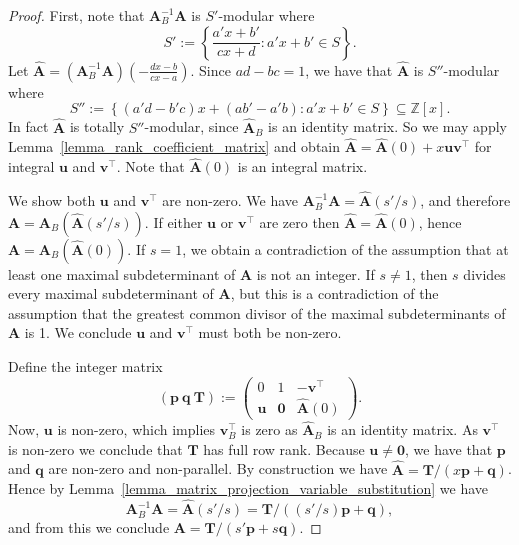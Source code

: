 \documentclass[a4paper, 11pt]{article}
\newcommand{\Z}{\mathbb{Z}}
\newcommand{\bA}{\bm{A}}
\newcommand{\bp}{\bm{p}}
\newcommand{\bq}{\bm{q}}
\newcommand{\bv}{\bm{v}}
\newcommand{\bw}{\bm{w}}
\newcommand{\bu}{\bm{u}}
\newcommand{\bT}{\bm{T}}
\newcommand{\indet}{x}
\newcommand{\polyring}{\Z[\indet]}
\newcommand{\polyS}{S}
\newcommand{\zero}{\bm{0}}
\newtheorem{proposition}{Proposition}
\begin{document}
\begin{proof}
First, note that $\bA_B^{-1}\bA$ is $\polyS'$-modular where
\[
\polyS':=\left\{\frac{a'x+b'}{cx+d}:a'x+b'\in\polyS\right\}.
\]
Let $\hat{\bA}=(\bA_B^{-1}\bA)(-\frac{dx-b}{cx-a})$. Since $ad-bc=1$, we have that $\hat{\bA}$ is $\polyS''$-modular where
\[
\polyS'':=\left\{(a'd-b'c)x+(ab'-a'b):a'x+b'\in\polyS\right\}\subseteq\polyring.
\]
In fact $\hat{\bA}$ is totally $\polyS''$-modular, since $\hat{\bA}_B$ is an identity matrix. So we may apply Lemma~\ref{lemma_rank_coefficient_matrix} and obtain $\hat{\bA}=\hat{\bA}(0)+x\bu\bv^\top$ for integral $\bu$ and $\bv^\top$. Note that $\hat{\bA}(0)$ is an integral matrix.

We show both $\bu$ and $\bv^\top$ are non-zero. We have $\bA^{-1}_B\bA=\hat{\bA}(s'/s)$, and therefore $\bA=\bA_B(\hat{\bA}(s'/s))$. If either $\bu$ or $\bv^\top$ are zero then $\hat{\bA}=\hat{\bA}(0)$, hence $\bA=\bA_B(\hat{\bA}(0))$. If $s=1$, we obtain a contradiction of the assumption that at least one maximal subdeterminant of $\bA$ is not an integer. If $s\neq 1$, then $s$ divides every maximal subdeterminant of $\bA$, but this is a contradiction of the assumption that the greatest common divisor of the maximal subdeterminants of $\bA$ is 1. We conclude $\bu$ and $\bv^\top$ must both be non-zero.

Define the integer matrix
\[
\left(\bp\ \bq\ \bT\right):=\left(\begin{array}{ccc}
0 & 1 & -\bv^{\top}\\
\bu & \zero & \hat{\bA}(0)
\end{array}\right).
\]
Now, $\bu$ is non-zero, which implies $\bv^\top_B$ is zero as $\hat{\bA}_B$ is an identity matrix. As $\bv^\top$ is non-zero we conclude that $\bT$ has full row rank. Because $\bu\neq\zero$, we have that $\bp$ and $\bq$ are non-zero and non-parallel. By construction we have $\hat{\bA}=\bT/(x\bp + \bq)$. Hence by Lemma~\ref{lemma_matrix_projection_variable_substitution} we have
\[
\bA^{-1}_B\bA=\hat{\bA}(s'/s)=\bT/((s'/s)\bp + \bq),
\]
and from this we conclude $\bA=\bT/(s'\bp + s\bq)$.
\end{proof}

\end{document}
